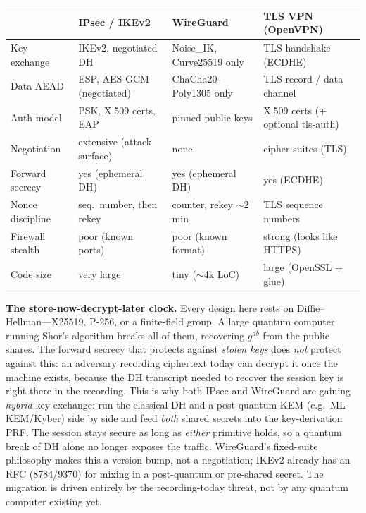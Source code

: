 \begin{center}
\renewcommand{\arraystretch}{1.3}
\begin{tabular}{@{}p{2.6cm}>{\raggedright\arraybackslash}p{3.3cm}>{\raggedright\arraybackslash}p{3.3cm}>{\raggedright\arraybackslash}p{3.3cm}@{}}
\toprule
& \textbf{IPsec / IKEv2} & \textbf{WireGuard} & \textbf{TLS VPN (OpenVPN)} \\
\midrule
Key exchange & IKEv2, negotiated DH & Noise\_IK, Curve25519 only & TLS handshake (ECDHE) \\
Data AEAD & ESP, AES-GCM (negotiated) & ChaCha20-Poly1305 only & TLS record / data channel \\
Auth model & PSK, X.509 certs, EAP & pinned public keys & X.509 certs (+ optional tls-auth) \\
Negotiation & extensive (attack surface) & none & cipher suites (TLS) \\
Forward secrecy & yes (ephemeral DH) & yes (ephemeral DH) & yes (ECDHE) \\
Nonce discipline & seq.\ number, then rekey & counter, rekey $\sim$2\,min & TLS sequence numbers \\
Firewall stealth & poor (known ports) & poor (known format) & strong (looks like HTTPS) \\
Code size & very large & tiny ($\sim$4k LoC) & large (OpenSSL + glue) \\
\bottomrule
\end{tabular}
\end{center}

\begin{connectionbox}
\textbf{The store-now-decrypt-later clock.} Every design here rests on Diffie--Hellman---X25519, P-256, or a finite-field group. A large quantum computer running Shor's algorithm breaks all of them, recovering \(g^{ab}\) from the public shares. The forward secrecy that protects against \emph{stolen keys} does \emph{not} protect against this: an adversary recording ciphertext today can decrypt it once the machine exists, because the DH transcript needed to recover the session key is right there in the recording. This is why both IPsec and WireGuard are gaining \emph{hybrid} key exchange: run the classical DH and a post-quantum KEM (e.g.\ ML-KEM/Kyber) side by side and feed \emph{both} shared secrets into the key-derivation PRF. The session stays secure as long as \emph{either} primitive holds, so a quantum break of DH alone no longer exposes the traffic. WireGuard's fixed-suite philosophy makes this a version bump, not a negotiation; IKEv2 already has an RFC (8784/9370) for mixing in a post-quantum or pre-shared secret. The migration is driven entirely by the recording-today threat, not by any quantum computer existing yet.
\end{connectionbox}

